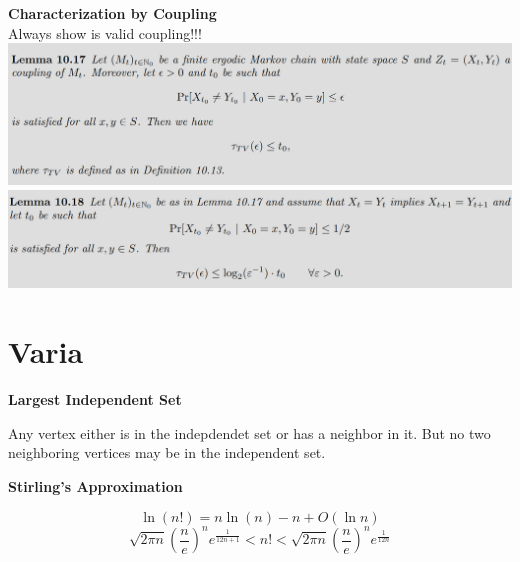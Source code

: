 \documentclass[25pt]{sciposter}
\newenvironment{defn}[1]{\begin{mdframed}[backgroundcolor=PineGreen!20,innertopmargin=15pt, innerbottommargin=15pt, nobreak=true]
		\textbf{#1 }
	}
	{ 
	\end{mdframed}
}
\begin{document}
\begin{multicols}{3}
\textbf{Characterization by Coupling}\\
Always show is valid coupling!!!\\
\includegraphics[width=1\linewidth]{screenshot018}
\includegraphics[width=\linewidth]{screenshot017}



		\section{Varia}
		\begin{defn}{Largest Independent Set}
Any vertex either is in the indepdendet set or has a neighbor in it. But no two neighboring vertices may be in the independent set.
		\end{defn}
		
		\begin{defn}{Stirling's Approximation}
			
\begin{equation*}
	\ln(n!) = n \ln (n) -n + O(\ln n)
\end{equation*}
\begin{equation*}
	\sqrt{2\pi n} \left(\frac{n}{e}\right)^n e^{\frac{1}{12n + 1}} < n! < 	\sqrt{2\pi n} \left(\frac{n}{e}\right)^n e^{\frac{1}{12n}}
\end{equation*}
\end{defn}		
		

		
	
	
	
	
	
	
	
	
	\newpage
	
	
	
	
	
	
	
	
	
	
	
	
	
	
	
	

		
		
		
	\end{multicols}
\end{document}
